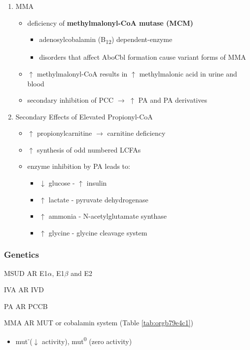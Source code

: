 \documentclass{scrartcl}
\begin{document}
\begin{enumerate}
\item MMA
\label{sec:org831beba}
\begin{itemize}
\item deficiency of \textbf{methylmalonyl-CoA mutase (MCM)}
\begin{itemize}
\item adenosylcobalamin (B\textsubscript{12}) dependent-enzyme
\item disorders that affect AboCbl formation cause variant
forms of MMA
\end{itemize}
\end{itemize}

\begin{itemize}
\item \(\uparrow\) methylmalonyl-CoA results in \(\uparrow\) methylmalonic acid
in urine and blood
\item secondary inhibition of PCC \(\to\) \(\uparrow\) PA and PA derivatives
\end{itemize}

\item Secondary Effects of Elevated Propionyl-CoA
\label{sec:orgf8dc5ce}
\begin{itemize}
\item \(\uparrow\) propionylcarnitine \(\to\) carnitine deficiency
\item \(\uparrow\) synthesis of odd numbered LCFAs
\item enzyme inhibition by PA leads to:
\begin{itemize}
\item \(\downarrow\) glucose - \(\uparrow\) insulin
\item \(\uparrow\) lactate - pyruvate dehydrogenase
\item \(\uparrow\) ammonia - N-acetylglutamate synthase
\item \(\uparrow\) glycine - glycine cleavage system
\end{itemize}
\end{itemize}
\end{enumerate}

\subsubsection{Genetics}
\label{sec:org0183d84}
\begin{description}
\item{MSUD} AR E1\(\alpha\), E1\(\beta\) and E2
\item{IVA} AR IVD
\item{PA} AR PCCB
\item{MMA} AR MUT or cobalamin system (Table \ref{tab:orgb79e4c1})
\begin{itemize}
\item mut\textsuperscript{-}(\(\downarrow\) activity), mut\textsuperscript{0} (zero activity)
\end{itemize}
\end{description}
\end{document}
